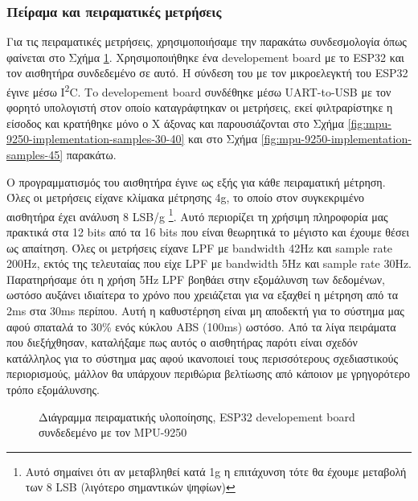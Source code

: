 \documentclass{article}
\begin{document}
\subsubsection{Πείραμα και πειραματικές μετρήσεις}
Για τις πειραματικές μετρήσεις, χρησιμοποιήσαμε την παρακάτω συνδεσμολογία όπως φαίνεται στο Σχήμα \ref{fig:mpu-9250-implementation-schematic}. Χρησιμοποιήθηκε ένα developement board με το ESP32 και τον αισθητήρα συνδεδεμένο σε αυτό. Η σύνδεση του με τον μικροελεγκτή του ESP32 έγινε μέσω I\textsuperscript{2}C. Τo developement board συνδέθηκε μέσω UART-to-USB με τον φορητό υπολογιστή στον οποίο καταγράφτηκαν οι μετρήσεις, εκεί φιλτραρίστηκε η είσοδος και κρατήθηκε μόνο ο Χ άξονας και παρουσιάζονται στο Σχήμα \ref{fig:mpu-9250-implementation-samples-30-40} και στο Σχήμα \ref{fig:mpu-9250-implementation-samples-45} παρακάτω.
\par
Ο προγραμματισμός του αισθητήρα έγινε ως εξής για κάθε πειραματική μέτρηση. Όλες οι μετρήσεις είχανε κλίμακα μέτρησης \tpm 4g, το οποίο στον συγκεκριμένο αισθητήρα έχει ανάλυση 8 LSB/g \footnote{Αυτό σημαίνει ότι αν μεταβληθεί κατά 1g η επιτάχυνση τότε θα έχουμε μεταβολή των 8 LSB (λιγότερο σημαντικών ψηφίων)}. Αυτό περιορίζει τη χρήσιμη πληροφορία μας πρακτικά στα 12 bits από τα 16 bits που είναι θεωρητικά το μέγιστο και έχουμε θέσει ως απαίτηση. Όλες οι μετρήσεις είχανε LPF με bandwidth 42Hz και sample rate 200Hz, εκτός της τελευταίας που είχε LPF με bandwidth 5Hz και sample rate 30Hz. Παρατηρήσαμε ότι η χρήση 5Hz LPF βοηθάει στην εξομάλυνση των δεδομένων, ωστόσο αυξάνει ιδιαίτερα το χρόνο που χρειάζεται για να εξαχθεί η μέτρηση από τα 2ms στα 30ms περίπου. Αυτή η καθυστέρηση είναι μη αποδεκτή για το σύστημα μας αφού σπαταλά το 30\% ενός κύκλου ABS (100ms) ωστόσο. Από τα λίγα πειράματα που διεξήχθησαν, καταλήξαμε πως αυτός ο αισθητήρας παρότι είναι σχεδόν κατάλληλος για το σύστημα μας αφού ικανοποιεί τους περισσότερους σχεδιαστικούς περιορισμούς, μάλλον θα υπάρχουν περιθώρια βελτίωσης από κάποιον με γρηγορότερο τρόπο εξομάλυνσης.

\begin{figure}[H]
\caption{Διάγραμμα πειραματικής υλοποίησης, ESP32 developement board συνδεδεμένο με τον MPU-9250}
\label{fig:mpu-9250-implementation-schematic}
\end{figure}
\end{document}
